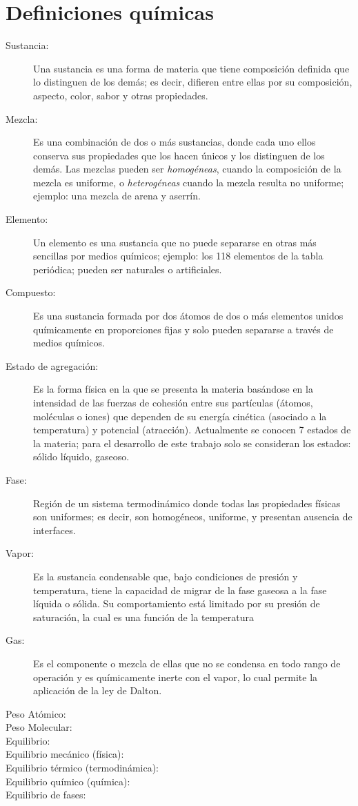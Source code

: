 \section{Definiciones químicas}
    \begin{description}
        \item[Sustancia:] Una sustancia es una forma de materia que tiene composición definida  que lo distinguen de los demás; es decir, difieren entre ellas por su composición, aspecto, color, sabor y otras propiedades.
        \item[Mezcla:] Es una combinación de dos o más sustancias, donde cada uno ellos conserva sus propiedades que los hacen únicos y los distinguen de los demás. Las mezclas pueden ser \textit{homogéneas}, cuando la composición de la mezcla es uniforme, o \textit{heterogéneas} cuando la mezcla resulta no uniforme; ejemplo: una mezcla de arena y aserrín. 
        \item[Elemento:] Un elemento es una sustancia que no puede separarse en otras más sencillas por medios químicos; ejemplo: los 118 elementos de la tabla periódica; pueden ser naturales o artificiales.
        \item[Compuesto:] Es una sustancia formada por dos átomos de dos o más elementos unidos químicamente en proporciones fijas y solo pueden separarse a través de medios químicos.
        \item[Estado de agregación:] Es la forma física en la que se presenta la materia basándose en la intensidad de las fuerzas de cohesión entre sus partículas (átomos, moléculas o iones) que dependen de su energía cinética (asociado a la temperatura) y potencial (atracción). Actualmente se conocen 7 estados de la materia; para el desarrollo de este trabajo solo se consideran los estados: sólido líquido, gaseoso.
        \item[Fase:] Región de un sistema termodinámico donde todas las propiedades físicas son uniformes; es decir, son homogéneos, uniforme, y presentan ausencia de interfaces.
        \item[Vapor:] Es la sustancia condensable que, bajo condiciones de presión y temperatura, tiene la capacidad de migrar de la fase gaseosa a la fase líquida o sólida. Su comportamiento está limitado por su presión de saturación, la cual es una función de la temperatura
        \item[Gas:] Es el componente o mezcla de ellas que no se condensa en todo rango de operación y es químicamente inerte con el vapor, lo cual permite la aplicación de la ley de Dalton. 
        \item[Peso Atómico:] 
        \item[Peso Molecular:] 
        \item[Equilibrio:] 
        \item[Equilibrio mecánico (física):]
        \item[Equilibrio térmico (termodinámica):]
        \item[Equilibrio químico (química):]
        \item[Equilibrio de fases:]
    \end{description}

